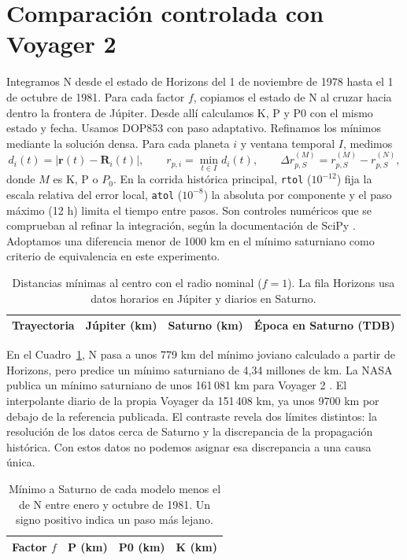 \documentclass[11pt,letterpaper]{article}
\newcommand{\vect}[1]{\mathbf{#1}}
\begin{document}
\FloatBarrier
\section{Comparación controlada con Voyager 2}
Integramos N desde el estado de Horizons del 1 de noviembre de 1978 hasta el 1 de octubre de 1981. Para cada factor $f$, copiamos el estado de N al cruzar hacia dentro la frontera de Júpiter. Desde allí calculamos K, P y P0 con el mismo estado y fecha. Usamos DOP853 con paso adaptativo. Refinamos los mínimos mediante la solución densa. Para cada planeta $i$ y ventana temporal $I$, medimos
\begin{equation}
d_i(t)=|\vect r(t)-\vect R_i(t)|,\qquad
r_{p,i}=\min_{t\in I}d_i(t),\qquad
\Delta r_{p,S}^{(M)}=r_{p,S}^{(M)}-r_{p,S}^{(N)},
\end{equation}
donde $M$ es K, P o $P_0$. En la corrida histórica principal, \texttt{rtol} ($10^{-12}$) fija la escala relativa del error local, \texttt{atol} ($10^{-8}$) la absoluta por componente y el paso máximo (12 h) limita el tiempo entre pasos. Son controles numéricos que se comprueban al refinar la integración, según la documentación de SciPy \cite{scipy}. Adoptamos una diferencia menor de 1000 km en el mínimo saturniano como criterio de equivalencia en este experimento.

\begin{table}[htbp]
\centering\small
\begin{tabular}{lrrl}
\toprule
Trayectoria & Júpiter (km) & Saturno (km) & Época en Saturno (TDB)\\
\midrule

\end{tabular}
\caption{Distancias mínimas al centro con el radio nominal ($f=1$). La fila Horizons usa datos horarios en Júpiter y diarios en Saturno.}
\label{tab:encuentros}
\end{table}

En el Cuadro~\ref{tab:encuentros}, N pasa a unos 779 km del mínimo joviano calculado a partir de Horizons, pero predice un mínimo saturniano de 4,34 millones de km. La NASA publica un mínimo saturniano de unos 161\,081 km para Voyager 2 \cite{nasa}. El interpolante diario de la propia Voyager da 151\,408 km, ya unos 9700 km por debajo de la referencia publicada. El contraste revela dos límites distintos: la resolución de los datos cerca de Saturno y la discrepancia de la propagación histórica. Con estos datos no podemos asignar esa discrepancia a una causa única.

\begin{table}[htbp]
\centering\small
\begin{tabular}{rrrr}
\toprule
Factor $f$ & P (km) & P0 (km) & K (km)\\
\midrule

\end{tabular}
\caption{Mínimo a Saturno de cada modelo menos el de N entre enero y octubre de 1981. Un signo positivo indica un paso más lejano.}
\label{tab:frontera}
\end{table}
\end{document}

